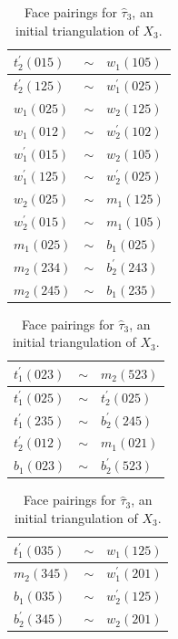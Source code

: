 \documentclass[reqno]{amsart}
\theoremstyle{plain}
\theoremstyle{definition}
\begin{document}
\begin{table}[ht]
\caption{Face pairings for $\hat{\tau}_3$, an initial triangulation of $X_3$.\label{table:p=3prelim}}
\begin{tabular}{ |l c l|  }
  \hline
\rowcolor{White} $t_2^\prime(015)$    &$\sim$	&$w_1(105)$\\
  \hline
 \rowcolor{White} $t_2^\prime(125)$    &$\sim$	&$w_1^\prime(025)$\\
  \hline
\rowcolor{White}   $w_1(025)$    &$\sim$	&$w_2(125)$\\
  \hline
\rowcolor{White}  $w_1(012)$    &$\sim$	&$w_2^\prime(102)$\\
  \hline
\rowcolor{White} $w_1^\prime(015)$    &$\sim$	&$w_2(105)$\\
  \hline
\rowcolor{White}  $w_1^\prime(125)$    &$\sim$	&$w_2^\prime(025)$\\
  \hline
\rowcolor{White}  $w_2(025)$    &$\sim$	&$m_1(125)$\\
 \hline
\rowcolor{White}  $w_2^\prime(015)$    &$\sim$	&$m_1(105)$\\
 \hline
\rowcolor{lightgray}  $m_1(025)$    &$\sim$	&$b_1(025)$\\
  \hline
\rowcolor{Gray}  $m_2(234)$    &$\sim$	&$b_2^\prime(243)$\\
  \hline
\rowcolor{Gray}   $m_2(245)$    &$\sim$	&$b_1(235)$\\
  \hline
\end{tabular}\quad
\begin{tabular}{ |l c l|  }
 \hline
\rowcolor{Gray}   $t_1^\prime(023)$    &$\sim$	&$m_2(523)$\\
  \hline
 \rowcolor{lightgray}  $t_1^\prime(025)$    &$\sim$	&$t_2^\prime(025)$\\
  \hline
\rowcolor{Gray}    $t_1^\prime(235)$    &$\sim$	&$b_2^\prime(245)$\\
  \hline
 \rowcolor{White}  $t_2^\prime(012)$    &$\sim$	&$m_1(021)$\\
  \hline
\rowcolor{Gray}   $b_1(023)$    &$\sim$	&$b_2^\prime(523)$\\
 \hline
\end{tabular}\quad
\begin{tabular}{ |l c l|  }
 \hline
  \rowcolor{lightgray}  $t_1^\prime(035)$    &$\sim$	&$w_1(125)$\\
  \hline
 \rowcolor{lightgray}   $m_2(345)$    &$\sim$	&$w_1^\prime(201)$\\
  \hline
 \rowcolor{lightgray}  $b_1(035)$    &$\sim$	&$w_2^\prime(125)$\\
 \hline
\rowcolor{lightgray}   $b_2^\prime(345)$    &$\sim$	&$w_2(201)$\\
 \hline
\end{tabular}
\end{table}
\end{document}
